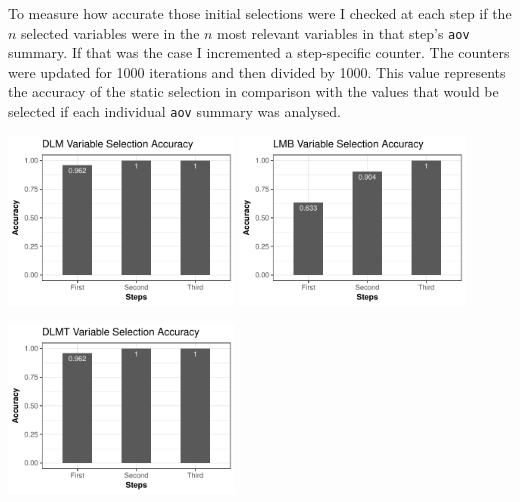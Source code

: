 \documentclass[final,12pt,a4paper]{article}
\begin{document}
To measure how accurate those initial selections were I checked at each step if
the \(n\) selected variables were in the \(n\) most relevant variables in that
step's \texttt{aov} summary. If that was the case I incremented a step-specific
counter. The counters were updated for 1000 iterations and then divided by 1000.
This value represents the accuracy of the static selection in comparison with
the values that would be selected if each individual \texttt{aov} summary was analysed.

\begin{center}
\includegraphics[width=0.45\textwidth]{../img/doptaov_accuracy.pdf}
\includegraphics[width=0.45\textwidth]{../img/lmbm_accuracy.pdf}
\end{center}

\begin{center}
\includegraphics[width=0.45\textwidth]{../img/dlmt_accuracy.pdf}
\end{center}
\end{document}
